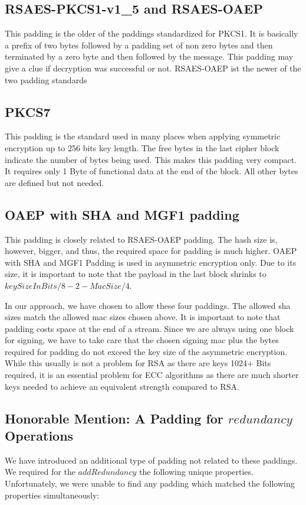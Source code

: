 \subsection{RSAES-PKCS1-v1\_5 and RSAES-OAEP}
This padding is the older of the paddings standardized for PKCS1. It is basically a prefix of two bytes followed by a padding set of non zero bytes and then terminated by a zero byte and then followed by the message. This padding may give a clue if decryption was successful or not. RSAES-OAEP ist the newer of the two padding standards 

\subsection{PKCS7} 
This padding is the standard used in many places when applying symmetric encryption up to 256 bits key length. The free bytes in the last cipher block indicate the number of bytes being used. This makes this padding very compact. It requires only 1 Byte of functional data at the end of the block. All other bytes are defined but not needed.

\subsection{OAEP with SHA and MGF1 padding} 
This padding is closely related to RSAES-OAEP padding. The hash size is, however, bigger, and thus, the required space for padding is much higher. OAEP with SHA and MGF1 Padding is used in asymmetric encryption only. Due to its size, it is important to note that the payload in the last block shrinks to $keySizeInBits/8-2-MacSize/4$.

In our approach, we have chosen to allow these four paddings. The allowed sha sizes match the allowed mac sizes chosen above. It is important to note that padding costs space at the end of a stream. Since we are always using one block for signing, we have to take care that the chosen signing mac plus the bytes required for padding do not exceed the key size of the asymmetric encryption. While this usually is not a problem for RSA as there are keys 1024+ Bits required, it is an essential problem for ECC algorithms as there are much shorter keys needed to achieve an equivalent strength compared to RSA. 

\subsection{Honorable Mention: A Padding for \texorpdfstring{$redundancy$}{redundancy} Operations}
We have introduced an additional type of padding not related to these paddings. We required for the $addRedundancy$ the following unique properties. Unfortunately, we were unable to find any padding which matched the following properties simultaneously:

